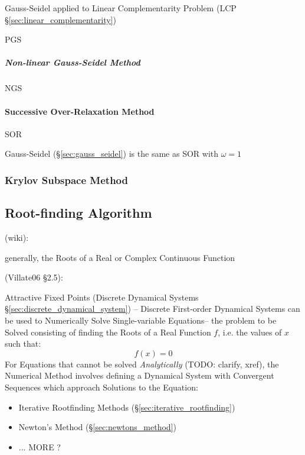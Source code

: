Gauss-Seidel applied to Linear Complementarity Problem (LCP
\S\ref{sec:linear_complementarity})

PGS



\subparagraph{Non-linear Gauss-Seidel Method}
\label{sec:nonlinear_gauss_seidel}

NGS



\paragraph{Successive Over-Relaxation Method}
\label{sec:successive_over_relaxation}\hfill

SOR

Gauss-Seidel (\S\ref{sec:gauss_seidel}) is the same as SOR with $\omega = 1$



\subsubsection{Krylov Subspace Method}\label{sec:krylov_subspace_method}



\subsection{Root-finding Algorithm}\label{sec:root_finding}

(wiki):

generally, the Roots of a Real or Complex Continuous Function

(Villate06 \S 2.5):

Attractive Fixed Points (Discrete Dynamical Systems
\S\ref{sec:discrete_dynamical_system}) --
Discrete First-order Dynamical Systems can be used to Numerically Solve
Single-variable Equations-- the problem to be Solved consisting of finding the
Roots of a Real Function $f$, i.e. the values of $x$ such that:
\[
  f(x) = 0
\]
For Equations that cannot be solved \emph{Analytically} (TODO: clarify, xref),
the Numerical Method involves defining a Dynamical System with Convergent
Sequences which approach Solutions to the Equation:
\begin{itemize}
  \item Iterative Rootfinding Methods (\S\ref{sec:iterative_rootfinding})
  \item Newton's Method (\S\ref{sec:newtons_method})
  \item ... MORE ?
\end{itemize}



